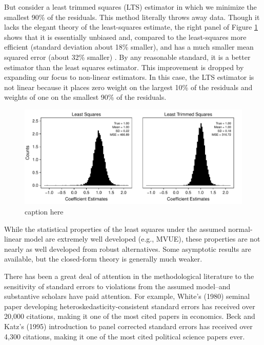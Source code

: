 \documentclass[10pt]{article}
\begin{document}
But consider a least trimmed squares (LTS) estimator in which we minimize the smallest 90\% of the residuals. This method literally throws away data. Though it lacks the elegant theory of the least-squares estimate, the right panel of Figure \ref{fig:lts-illustration} shows that it is essentially unbiased and, compared to the least-squares more efficient (standard deviation about 18\% smaller), and has a much smaller mean squared error (about 32\% smaller) . By any reasonable standard, it is a better estimator than the least squares estimator. This improvement is dropped by expanding our focus to non-linear estimators. In this case, the LTS estimator is not linear because it places zero weight on the largest 10\% of the residuals and weights of one on the smallest 90\% of the residuals.

\begin{figure}[H]
\begin{center}
\includegraphics[scale = .7]{figs/lts-illustration.pdf}
\caption{caption here}\label{fig:lts-illustration}
\end{center}
\end{figure}

While the statistical properties of the least squares under the assumed normal-linear model are extremely well developed (e.g., MVUE), these properties are not nearly as well developed from robust alternatives. Some asymptotic results are available, but the closed-form theory is generally much weaker.

There has been a great deal of attention in the methodological literature to the sensitivity of standard errors to violations from the assumed model--and substantive scholars have paid attention. For example, White's (1980) seminal paper developing heteroskedasticity-consistent standard errors has received over 20,000 citations, making it one of the most cited papers in economics. Beck and Katz's (1995) introduction to panel corrected standard errors has received over 4,300 citations, making it one of the most cited political science papers ever.
\end{document}
